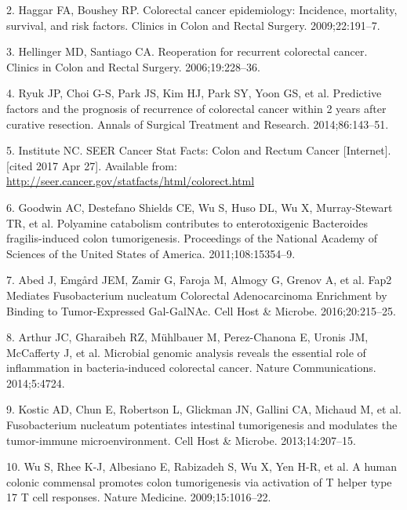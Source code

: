 \documentclass[12pt,]{article}
\begin{document}
\hypertarget{ref-haggar_colorectal_2009}{}
2. Haggar FA, Boushey RP. Colorectal cancer epidemiology: Incidence,
mortality, survival, and risk factors. Clinics in Colon and Rectal
Surgery. 2009;22:191--7.

\hypertarget{ref-hellinger_reoperation_2006}{}
3. Hellinger MD, Santiago CA. Reoperation for recurrent colorectal
cancer. Clinics in Colon and Rectal Surgery. 2006;19:228--36.

\hypertarget{ref-ryuk_predictive_2014}{}
4. Ryuk JP, Choi G-S, Park JS, Kim HJ, Park SY, Yoon GS, et al.
Predictive factors and the prognosis of recurrence of colorectal cancer
within 2 years after curative resection. Annals of Surgical Treatment
and Research. 2014;86:143--51.

\hypertarget{ref-national_cancer_institute_seer_nodate}{}
5. Institute NC. SEER Cancer Stat Facts: Colon and Rectum Cancer
{[}Internet{]}. {[}cited 2017 Apr 27{]}. Available from:
\url{http://seer.cancer.gov/statfacts/html/colorect.html}

\hypertarget{ref-goodwin_polyamine_2011}{}
6. Goodwin AC, Destefano Shields CE, Wu S, Huso DL, Wu X, Murray-Stewart
TR, et al. Polyamine catabolism contributes to enterotoxigenic
Bacteroides fragilis-induced colon tumorigenesis. Proceedings of the
National Academy of Sciences of the United States of America.
2011;108:15354--9.

\hypertarget{ref-abed_fap2_2016}{}
7. Abed J, Emgård JEM, Zamir G, Faroja M, Almogy G, Grenov A, et al.
Fap2 Mediates Fusobacterium nucleatum Colorectal Adenocarcinoma
Enrichment by Binding to Tumor-Expressed Gal-GalNAc. Cell Host \&
Microbe. 2016;20:215--25.

\hypertarget{ref-arthur_microbial_2014}{}
8. Arthur JC, Gharaibeh RZ, Mühlbauer M, Perez-Chanona E, Uronis JM,
McCafferty J, et al. Microbial genomic analysis reveals the essential
role of inflammation in bacteria-induced colorectal cancer. Nature
Communications. 2014;5:4724.

\hypertarget{ref-kostic_fusobacterium_2013}{}
9. Kostic AD, Chun E, Robertson L, Glickman JN, Gallini CA, Michaud M,
et al. Fusobacterium nucleatum potentiates intestinal tumorigenesis and
modulates the tumor-immune microenvironment. Cell Host \& Microbe.
2013;14:207--15.

\hypertarget{ref-wu_human_2009}{}
10. Wu S, Rhee K-J, Albesiano E, Rabizadeh S, Wu X, Yen H-R, et al. A
human colonic commensal promotes colon tumorigenesis via activation of T
helper type 17 T cell responses. Nature Medicine. 2009;15:1016--22.
\end{document}
